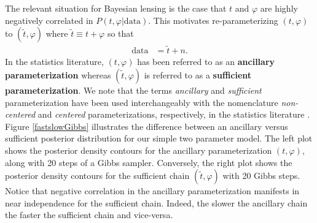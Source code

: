 \documentclass[iop,revtex4,apj,onecolumn]{emulateapj}
\begin{document}
The relevant situation for Bayesian lensing is the case that $ t$ and $\varphi$ are highly negatively correlated in $P( t, \varphi|\text{data})$.  This motivates re-parameterizing $( t,\varphi)$ to $(\widetilde  t, \varphi)$ where $\widetilde  t \equiv  t + \varphi$ so that
\begin{align*}
\text{data} &= \widetilde  t + n.
\end{align*}
In the statistics literature,  $( t, \varphi)$ has been referred to as an {\bf ancillary parameterization} whereas $(\widetilde  t, \varphi)$ is referred to as a {\bf sufficient parameterization}.
We note that the terms {\em ancillary} and {\em sufficient } parameterization have been used interchangeably with the nomenclature {\em non-centered} and {\em centered } parameterizations, respectively, in the statistics literature \cite{bernardo2003non,gelfand1995efficient,papaspiliopoulos2008stability,papaspiliopoulos2007general,yu2011center}.  Figure  \ref{fastslowGibbs} illustrates the difference between an ancillary versus sufficient posterior distribution for our simple two parameter model. The left plot shows the posterior density contours for the ancillary parameterization $( t, \varphi)$, along with 20 steps of a Gibbs sampler.  Conversely, the right plot shows the posterior density contours for the sufficient chain $(\widetilde  t, \varphi)$ with 20 Gibbs steps. Notice that negative correlation  in the ancillary parameterization manifests in near independence for the sufficient chain.  Indeed, the slower the ancillary chain the faster the sufficient chain and vice-versa.
\end{document}
